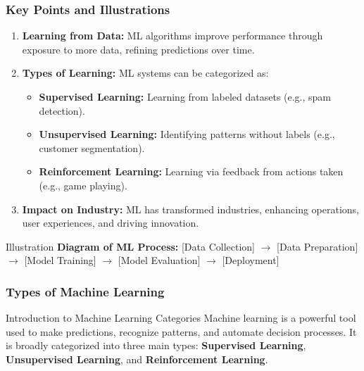 \documentclass{beamer}
\begin{document}
\begin{frame}[fragile]
    \frametitle{Key Points and Illustrations}
    \begin{enumerate}
        \item \textbf{Learning from Data:}  
        ML algorithms improve performance through exposure to more data, refining predictions over time.
        
        \item \textbf{Types of Learning:}  
        ML systems can be categorized as:
        \begin{itemize}
            \item \textbf{Supervised Learning:} Learning from labeled datasets (e.g., spam detection).
            \item \textbf{Unsupervised Learning:} Identifying patterns without labels (e.g., customer segmentation).
            \item \textbf{Reinforcement Learning:} Learning via feedback from actions taken (e.g., game playing).
        \end{itemize}
        
        \item \textbf{Impact on Industry:}  
        ML has transformed industries, enhancing operations, user experiences, and driving innovation.
    \end{enumerate}
    
    \begin{block}{Illustration}
        \textbf{Diagram of ML Process:}  
        [Data Collection] $\rightarrow$ [Data Preparation] $\rightarrow$ [Model Training] $\rightarrow$ [Model Evaluation] $\rightarrow$ [Deployment]
    \end{block}
\end{frame}

\begin{frame}[fragile]
    \frametitle{Types of Machine Learning}
    \begin{block}{Introduction to Machine Learning Categories}
        Machine learning is a powerful tool used to make predictions, recognize patterns, and automate decision processes.
        It is broadly categorized into three main types: 
        \textbf{Supervised Learning}, \textbf{Unsupervised Learning}, and \textbf{Reinforcement Learning}.
    \end{block}
\end{frame}
\end{document}
